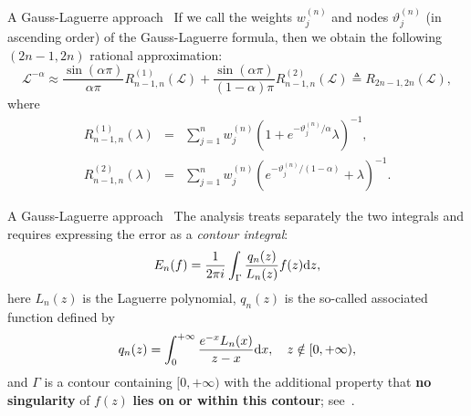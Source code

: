 \documentclass[aspectratio=169,xcolor=dvipsnames]{beamer}
\newcommand{\de}{{\rm d}}
\begin{document}
	\begin{frame}{A Gauss-Laguerre approach~\parencite{MR4410753}}
	If we call the weights $w_{j}^{(n)}$ and
	nodes $\vartheta _{j}^{(n)}$ (in ascending order) of the Gauss-Laguerre formula, then we obtain the following $(2n-1,2n)$ rational
	approximation:
	\[
	\mathcal{L}^{-\alpha }\approx\frac{\sin (\alpha \pi )}{\alpha \pi } R_{n-1,n}^{(1)}(\mathcal{L})+ \frac{\sin (\alpha \pi )}{(1-\alpha) \pi }R_{n-1,n}^{(2)}(\mathcal{L})
	\triangleq R_{2n-1,2n}(\mathcal{L}),
	\]
	where 
	\begin{eqnarray*}
		R_{n-1,n}^{(1)}(\lambda ) &=&\sum_{j=1}^{n}w_{j}^{(n)}%
		\left( 1+e^{-{\vartheta _{j}^{(n)}}/{\alpha }}\lambda \right) ^{-1}, \\
		R_{n-1,n}^{(2)}(\lambda ) &=&\sum_{j=1}^{n}w_{j}^{(n)}%
		\left( e^{-{\vartheta _{j}^{(n)}}/{(1-\alpha) }}+\lambda \right) ^{-1}.
	\end{eqnarray*}%
	
	\end{frame}

	\begin{frame}{A Gauss-Laguerre approach~\parencite{MR4410753}}
	The analysis treats separately the two integrals and requires expressing the error as a \emph{contour integral}:
	\[
	E_{n}(f)=\frac{1}{2\pi i}\int_{\Gamma }\frac{q_{n}(z)}{L_{n}(z)}f(z){\de}z,
	\]
	here $L_{n}(z)$ is the Laguerre polynomial, $q_{n}(z)$ is the so-called
	associated function defined by%
	\begin{equation*}
		q_{n}(z)=\int\nolimits_{0}^{+\infty }\frac{e^{-x}L_{n}(x)}{z-x}{\de}x,\quad
		z\notin \lbrack 0,+\infty ),
	\end{equation*}%
	and $\Gamma $ is a contour containing $[0,+\infty )$ with the additional
	property that \alert{\textbf{no singularity}} of $f(z)$ \alert{\textbf{lies on or within this contour}}; see~\parencite[{\S}4.6]{MR760629}.
	\end{frame}
\end{document}
